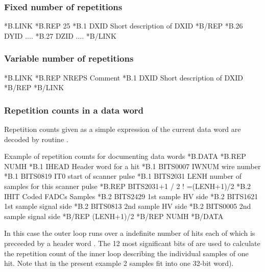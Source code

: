 \begin{minipage}{.48\textwidth}
\subsubsection*{Fixed number of repetitions}
\begin{XMP}
*B.LINK
*B.REP    25
*B.1      DXID     Short description of DXID
*B/REP
*B.26     DYID     ....
*B.27     DZID     ....
*B/LINK
\end{XMP}
\end{minipage}     
\hfill 
\begin{minipage}{.48\textwidth}
\subsubsection*{Variable number of repetitions}
\begin{XMP}
*B.LINK
*B.REP    NREPS    Comment
*B.1      DXID     Short description of DXID
*B/REP
*B/LINK
\end{XMP}
\end{minipage}
 
\subsubsection*{Repetition counts in a data word}

\begin{minipage}{\textwidth}
Repetition counts given as a simple expression of the current data
word are decoded by routine .
 
\begin{XMPt}{Example of repetition counts for documenting data words}
*B.DATA
*B.REP  NUMH
*B.1    IHEAD      Header word for a hit
*B.1    BITS0007   IWNUM   wire number
*B.1    BITS0819   IT0     start of scanner pulse
*B.1    BITS2031   LENH    number of samples for this scanner pulse
*B.REP  BITS2031+1 / 2     ! =(LENH+1)/2
*B.2    IHIT       Coded FADCs Samples
*B.2    BITS2429   1st sample HV side
*B.2    BITS1621   1st sample signal side
*B.2    BITS0813   2nd sample HV side
*B.2    BITS0005   2nd sample signal side
*B/REP  (LENH+1)/2
*B/REP  NUMH
*B/DATA
\end{XMPt}
\end{minipage}

\newpage
 
In this case the outer loop runs over a indefinite number  of
hits each of which is preceeded by a header word .
The 12 most significant bits of 
are used to calculate the repetition count of the inner loop describing
the individual samples of one hit.
Note that in the present example 2 samples fit into one 32-bit word).
 
